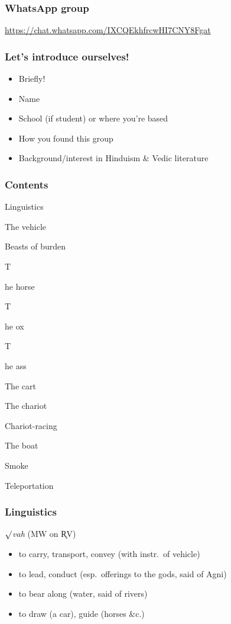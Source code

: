 \documentclass[pdf]{beamer}
\newcommand{\Subitem}[1]{{\setlength\itemindent{12pt} \item[-] #1}}
\begin{document}
\begin{frame} \frametitle{WhatsApp group}
\begin{center}
	\href{https://chat.whatsapp.com/IXCQEkhfrcwHI7CNY8Fgat}{https://chat.whatsapp.com/IXCQEkhfrcwHI7CNY8Fgat}
\end{center}
\end{frame}

\begin{frame} \frametitle{Let's introduce ourselves!}
\begin{itemize}
	\item Briefly!
	\item Name
	\item School (if student) or where you're based
	\item How you found this group
	\item Background/interest in Hinduism \& Vedic literature
\end{itemize}
\end{frame}

\begin{frame} \frametitle{Contents}
\begin{itemize}
	\item Linguistics
	\item The vehicle
	\item Beasts of burden
	\Subitem The horse
	\Subitem The ox
	\Subitem The ass
	\item The cart
	\item The chariot
	\item Chariot-racing
	\item The boat
	\item Smoke
	\item Teleportation
\end{itemize}
\end{frame}

\begin{frame} \frametitle{Linguistics}
\begin{block} {$\surd$\textit{vah} (MW on R̥V)}
\begin{itemize}
	\item to carry, transport, convey (with instr.~of vehicle)
	\item to lead, conduct (esp.~offerings to the gods, said of Agni)
	\item to bear along (water, said of rivers)
	\item to draw (a car), guide (horses \&c.)
\end{itemize}
\end{block}
\end{frame}
\end{document}

